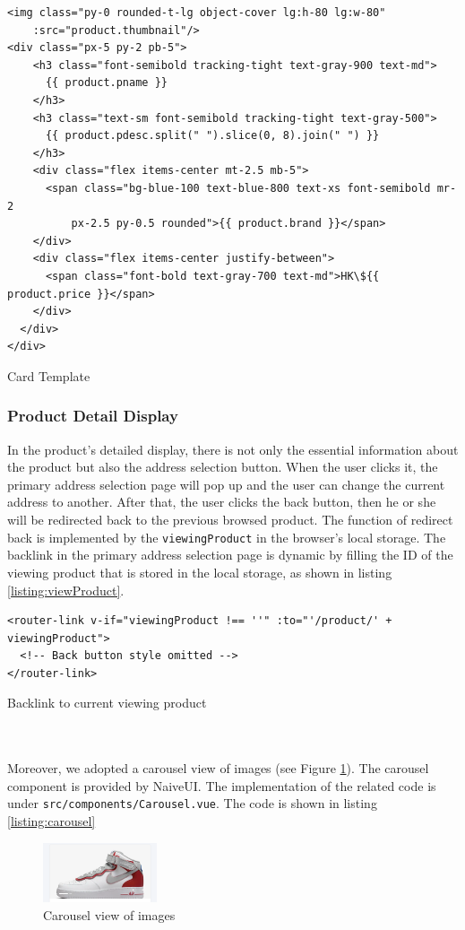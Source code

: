 \documentclass{article}
\begin{document}
\begin{listing}[!htp]
\begin{verbatim}
<img class="py-0 rounded-t-lg object-cover lg:h-80 lg:w-80" 
    :src="product.thumbnail"/>
<div class="px-5 py-2 pb-5">
    <h3 class="font-semibold tracking-tight text-gray-900 text-md">
      {{ product.pname }}
    </h3>
    <h3 class="text-sm font-semibold tracking-tight text-gray-500">
      {{ product.pdesc.split(" ").slice(0, 8).join(" ") }}
    </h3>
    <div class="flex items-center mt-2.5 mb-5">
      <span class="bg-blue-100 text-blue-800 text-xs font-semibold mr-2 
          px-2.5 py-0.5 rounded">{{ product.brand }}</span>
    </div>
    <div class="flex items-center justify-between">
      <span class="font-bold text-gray-700 text-md">HK\${{ product.price }}</span>
    </div>
  </div>
</div>
\end{verbatim}
\caption{Card Template}
\label{listing:card-template}
\end{listing}

\subsubsection{Product Detail Display}

In the product's detailed display, there is not only the essential information about the product but also the address selection button. When the user clicks it, the primary address selection page will pop up and the user can change the current address to another. After that, the user clicks the back button, then he or she will be redirected back to the previous browsed product. The function of redirect back is implemented by the \verb|viewingProduct| in the browser's local storage. The backlink in the primary address selection page is dynamic by filling the ID of the viewing product that is stored in the local storage, as shown in listing \ref{listing:viewProduct}.

\begin{listing}[!htp]
\begin{verbatim}
<router-link v-if="viewingProduct !== ''" :to="'/product/' + viewingProduct">
  <!-- Back button style omitted -->
</router-link>
\end{verbatim}
\caption{Backlink to current viewing product}
\label{listing:viewProduct}
\end{listing}

\leavevmode
\\\\
Moreover, we adopted a carousel view of images (see Figure \ref{fig:carousel}). The carousel component is provided by NaiveUI. The implementation of the related code is under \verb|src/components/Carousel.vue|. The code is shown in listing \ref{listing:carousel}
\begin{figure}[!htp]
    \centering
    \includegraphics[width=0.3\textwidth]{Carousel.png}
    \caption{\label{fig:carousel}Carousel view of images}
\end{figure}
\end{document}
